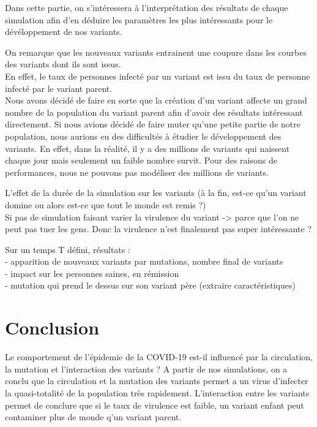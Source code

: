 \documentclass{article}
\begin{document}
Dans cette partie, on s'intéressera à l'interprétation des résultats de chaque simulation afin d'en déduire les paramètres les plus intéressants pour le dévéloppement de nos variants.



On remarque que les nouveaux variants entrainent une coupure dans les courbes des variants dont ils sont issus. \\
En effet, le taux de personnes infecté par un variant est issu du taux de personne infecté par le variant parent. \\
Nous avons décidé de faire en sorte que la création d'un variant affecte un grand nombre de la population du variant parent afin d'avoir des résultats intéressant directement. Si nous avions décidé de faire muter qu'une petite partie de notre population, nous aurions eu des difficultés à étudier le développement des variants. En effet, dans la réalité, il y a des millions de variants qui naissent chaque jour mais seulement un faible nombre survit. Pour des raisons de performances, nous ne pouvons pas modéliser des millions de variants.

L'effet de la durée de la simulation sur les variants (à la fin, est-ce qu'un variant domine ou alors est-ce que tout le monde est remis ?) \\

Si pas de simulation faisant varier la virulence du variant -> parce que l'on ne peut pas tuer les gens. Donc la virulence n'est finalement pas super intéressante ?

Sur un temps T défini, résultats :\\
- apparition de nouveaux variants par mutations, nombre final de variants\\
- impact sur les personnes saines, en rémission\\
- mutation qui prend le dessus sur son variant père (extraire caractéristiques)\\

\section{Conclusion}

Le comportement de l'épidemie de la COVID-19 est-il influencé par la circulation, la mutation et l'interaction des variants ?
A partir de nos simulations, on a conclu que la circulation et la mutation des variants permet a un virus d'infecter la quasi-totalité de la population très rapidement. L'interaction entre les variants permet de conclure que si le taux de virulence est faible, un variant enfant peut contaminer plus de monde q'un variant parent. \\
\end{document}
